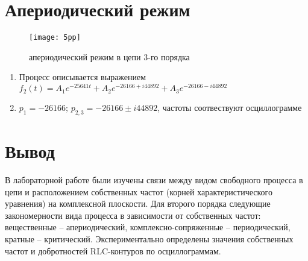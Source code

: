 \documentclass[a4paper,14pt ]{article} %
\begin{document}
\section{Апериодический режим}
\begin{figure}[H]
    \centering
    \texttt{[image: 5pp]}
    \caption{апериодический режим в цепи 3-го порядка}
\end{figure}
\begin{enumerate}
    \item Процесс описывается выражением $f_2(t) = A_1e^{-25641t} + 
    A_2e^{-26166+i44892} + A_3e^{-26166-i44892}$
    \item $p_1 = -26166; \, p_{2,3} = -26166 \pm i44892$, частоты соотвествуют осциллограмме
\end{enumerate}
\section{Вывод}
В лабораторной работе были изучены связи между видом свободного
процесса в цепи и расположением собственных частот (корней характеристического уравнения) на комплексной плоскости. Для второго порядка следующие закономерности вида процесса в зависимости от собственных частот: вещественные – апериодический, комплексно-сопряженные – периодический, кратные – критический. Экспериментально определены значения собственных частот и добротностей RLC-контуров по осциллограммам. 
\end{document}
